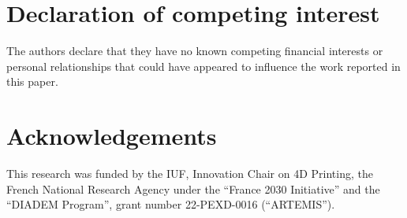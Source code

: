 \documentclass[12pt]{article}
\begin{document}
\section*{Declaration of competing interest}
The authors declare that they have no known competing financial interests or personal relationships that could have appeared to influence the work reported in this paper.

\section*{Acknowledgements}
This research was funded by the IUF, Innovation Chair on 4D Printing, the French National Research Agency under the “France 2030 Initiative” and the “DIADEM Program”, grant number 22-PEXD-0016 (“ARTEMIS”).



\end{document}
